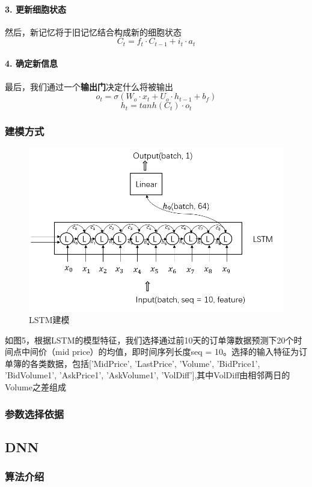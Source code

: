 \documentclass[UTF8]{ctexart}
\begin{document}
\paragraph*{3. 更新细胞状态}
然后，新记忆将于旧记忆结合构成新的细胞状态
$$C_t = f_t\cdot C_{t-1} + i_t \cdot a_t$$
\paragraph*{4. 确定新信息}
最后，我们通过一个\textbf{输出门}决定什么将被输出
$$o_t = \sigma(W_o\cdot x_t + U_o\cdot h_{t-1} + b_f)$$
$$h_t = tanh(C_t)\cdot o_t$$
\subsubsection{建模方式}
\begin{figure}[!htbp]
    \centering
    \includegraphics[scale = 0.6]{p6.png}
    \caption{LSTM建模\cite{2}}
\end{figure}
如图5，根据LSTM的模型特征，我们选择通过前10天的订单簿数据预测下20个时间点中间价（mid price）的均值，即时间序列长度seq = 10。选择的输入特征为订单簿的各类数据，包括['MidPrice', 'LastPrice', 'Volume', 'BidPrice1', 'BidVolume1', 'AskPrice1', 'AskVolume1', 'VolDiff'],其中VolDiff由相邻两日的Volume之差组成

\subsubsection{参数选择依据}
\subsection{DNN}
\subsubsection{算法介绍}
\end{document}
